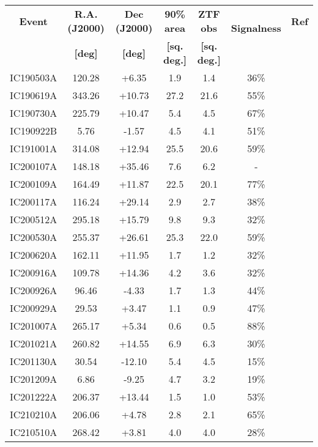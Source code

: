 \begin{table*}
	\centering
	\begin{tabular}{||c c c c c c c ||} 
		\hline
		\textbf{Event} & \textbf{R.A. (J2000)} & \textbf{Dec (J2000)} & \textbf{90\% area} & \textbf{ZTF obs} &~ \textbf{Signalness}& \textbf{Ref}\\
		& \textbf{[deg]}&\textbf{[deg]}& \textbf{[sq. deg.]}& \textbf{[sq. deg.]} &&\\
		\hline
		IC190503A & 120.28 & +6.35 & 1.9 & 1.4 & 36\% & \cite{ic190503a, ic190503a_ztf} \\ 
		IC190619A & 343.26 & +10.73 & 27.2 & 21.6 & 55\% & \cite{ic190619a, ic190619a_ztf} \\ 
		IC190730A & 225.79 & +10.47 & 5.4 & 4.5 & 67\% & \cite{ic190730a, ic190730a_ztf} \\ 
		IC190922B & 5.76 & -1.57 & 4.5 & 4.1 & 51\% & \cite{ic190922b, ic190922b_ztf} \\ 
		IC191001A & 314.08 & +12.94 & 25.5 & 20.6 & 59\% & \cite{ic191001a, ic191001a_ztf} \\ 
		IC200107A & 148.18 & +35.46 & 7.6 & 6.2 & - & \cite{ic200107a, ic200107a_ztf} \\ 
		IC200109A & 164.49 & +11.87 & 22.5 & 20.1 & 77\% & \cite{ic200109a, ic200109a_ztf} \\ 
		IC200117A & 116.24 & +29.14 & 2.9 & 2.7 & 38\% & \cite{ic200117a, ic200117a_ztf, ic200117a_ztf2} \\ 
		IC200512A & 295.18 & +15.79 & 9.8 & 9.3 & 32\% & \cite{ic200512a, ic200512a_ztf} \\ 
		IC200530A & 255.37 & +26.61 & 25.3 & 22.0 & 59\% & \cite{ic200530a, ic200530a_ztf, ic200530a_ztf2} \\ 
		IC200620A & 162.11 & +11.95 & 1.7 & 1.2 & 32\% & \cite{ic200620a, ic200620a_ztf} \\ 
		IC200916A & 109.78 & +14.36 & 4.2 & 3.6 & 32\% & \cite{ic200916a, ic200916a_ztf, ic200916a_ztf2} \\ 
		IC200926A & 96.46 & -4.33 & 1.7 & 1.3 & 44\% & \cite{ic200926a, ic200926a_ztf} \\ 
		IC200929A & 29.53 & +3.47 & 1.1 & 0.9 & 47\% & \cite{ic200929a, ic200929a_ztf} \\ 
		IC201007A & 265.17 & +5.34 & 0.6 & 0.5 & 88\% & \cite{ic201007a, ic201007a_ztf} \\ 
		IC201021A & 260.82 & +14.55 & 6.9 & 6.3 & 30\% & \cite{ic201021a, ic201021a_ztf} \\ 
		IC201130A & 30.54 & -12.10 & 5.4 & 4.5 & 15\% & \cite{ic201130a, ic201130a_ztf} \\ 
		IC201209A & 6.86 & -9.25 & 4.7 & 3.2 & 19\% & \cite{ic201209a, ic201209a_ztf} \\ 
		IC201222A & 206.37 & +13.44 & 1.5 & 1.0 & 53\% & \cite{ic201222a, ic201222a_ztf} \\ 
		IC210210A & 206.06 & +4.78 & 2.8 & 2.1 & 65\% & \cite{ic210210a, ic210210a_ztf} \\ 
		IC210510A & 268.42 & +3.81 & 4.0 & 4.0 & 28\% & \cite{ic210510a, ic210510a_ztf} \\ 
		

\end{tabular}
\end{table*}

